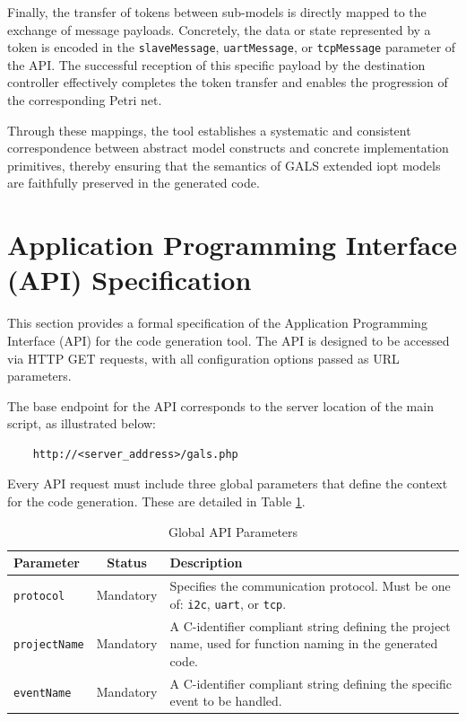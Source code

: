 Finally, the transfer of tokens between sub-models is directly mapped to the exchange of message payloads. Concretely, the data or state represented by a token is encoded in the \texttt{slaveMessage}, \texttt{uartMessage}, or \texttt{tcpMessage} parameter of the API. The successful reception of this specific payload by the destination controller effectively completes the token transfer and enables the progression of the corresponding Petri net.

Through these mappings, the tool establishes a systematic and consistent correspondence between abstract model constructs and concrete implementation primitives, thereby ensuring that the semantics of GALS extended \gls{iopt} models are faithfully preserved in the generated code.



\section{Application Programming Interface (API) Specification}
\label{sec:api_spec}

This section provides a formal specification of the Application Programming Interface (API) for the code generation tool. The API is designed to be accessed via HTTP GET requests, with all configuration options passed as URL parameters.

The base endpoint for the API corresponds to the server location of the main script, as illustrated below:
\begin{verbatim}
    http://<server_address>/gals.php
\end{verbatim}

Every API request must include three global parameters that define the context for the code generation. These are detailed in Table \ref{tab:global_params}.

\begin{table}[h!]
    \centering
    \caption{Global API Parameters}
    \label{tab:global_params}
    \begin{tabular}{|l|c|p{9cm}|}
        \hline
        \textbf{Parameter} & \textbf{Status} & \textbf{Description} \\ \hline
        \texttt{protocol} & Mandatory & Specifies the communication protocol. Must be one of: \texttt{i2c}, \texttt{uart}, or \texttt{tcp}. \\ \hline
        \texttt{projectName} & Mandatory & A C-identifier compliant string defining the project name, used for function naming in the generated code. \\ \hline
        \texttt{eventName} & Mandatory & A C-identifier compliant string defining the specific event to be handled. \\ \hline
    \end{tabular}
\end{table}

